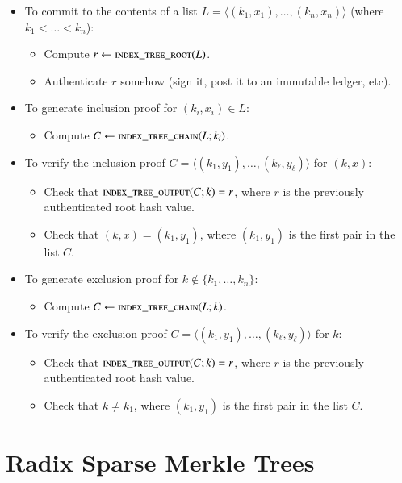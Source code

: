 \begin{itemize}
	\item To commit to the contents of a list $L = \langle (k_1, x_1), \ldots, (k_n, x_n) \rangle$ (where $k_1 < \ldots < k_n$):
		\begin{itemize}
			\item Compute $r \gets \Call{index\_tree\_root}{L}$.
			\item Authenticate $r$ somehow (sign it, post it to an immutable ledger, etc).
		\end{itemize}
	\item To generate inclusion proof for $(k_i, x_i) \in L$:
		\begin{itemize}
			\item Compute $C \gets \Call{index\_tree\_chain}{L; k_i}$.
		\end{itemize}
	\item To verify the inclusion proof $C = \langle (k_1, y_1), \ldots, (k_\ell, y_\ell) \rangle$ for $(k, x)$:
		\begin{itemize}
			\item Check that $\Call{index\_tree\_output}{C; k} = r$, where $r$ is the previously authenticated root hash value.
			\item Check that $(k, x) = (k_1, y_1)$, where $(k_1, y_1)$ is the first pair in the list $C$.
		\end{itemize}
	\item To generate exclusion proof for $k \not\in \{k_1, \ldots, k_n\}$:
		\begin{itemize}
			\item Compute $C \gets \Call{index\_tree\_chain}{L; k}$.
		\end{itemize}
	\item To verify the exclusion proof $C = \langle (k_1, y_1), \ldots, (k_\ell, y_\ell) \rangle$ for $k$:
		\begin{itemize}
			\item Check that $\Call{index\_tree\_output}{C; k} = r$, where $r$ is the previously authenticated root hash value.
			\item Check that $k \ne k_1$, where $(k_1, y_1)$ is the first pair in the list $C$.
		\end{itemize}
\end{itemize}


\section{Radix Sparse Merkle Trees}\label{app:rsmt}

